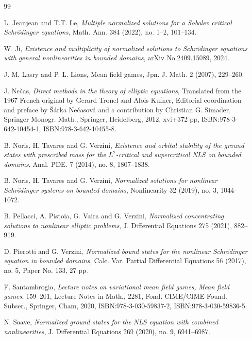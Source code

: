 \documentclass[11pt]{amsart}
\numberwithin{equation}{section}
\begin{document}
\begin{thebibliography}{99}

 L. Jeanjean and T.T. Le, {\it Multiple normalized solutions for a Sobolev critical Schr\"odinger  equations}, Math. Ann.
384 (2022), no. 1--2, 101--134.

 W. Ji, {\it Existence and multiplicity of normalized solutions to Schr\"odinger equations with general nonlinearities in bounded domains}, arXiv No.2409.15089, 2024.


J. M. Lasry and P. L. Lions, Mean field games, Jpn. J. Math. 2 (2007), 229--260.

J. Ne\v{c}as, {\it Direct methods in the theory of elliptic equations}, Translated from the 1967 French original by Gerard Tronel and Alois Kufner, Editorial coordination and preface by \v{S}\'arka Ne\v{c}asov\'a and a contribution by Christian G. Simader, Springer Monogr. Math., Springer, Heidelberg, 2012, xvi+372 pp, ISBN:978-3-642-10454-1, ISBN:978-3-642-10455-8.

 B. Noris, H. Tavares and G. Verzini, {\it Existence and orbital stability of the ground
	states with prescribed mass for the $L^2$-critical and supercritical NLS on bounded domains},
Anal. PDE. 7 (2014), no. 8, 1807--1838.

 B. Noris, H. Tavares and G. Verzini, {\it Normalized solutions for nonlinear Schr\"odinger systems on bounded domains},
Nonlinearity 32 (2019), no. 3, 1044--1072.

B. Pellacci, A. Pistoia, G. Vaira and G. Verzini, {\it Normalized concentrating solutions to nonlinear elliptic problems}, J. Differential Equations 275 (2021), 882--919.

 D. Pierotti and G. Verzini, {\it Normalized bound states for the nonlinear  Schr\"odinger equation in bounded domains},
Calc. Var. Partial Differential Equations  56 (2017), no. 5, Paper No. 133, 27 pp.

F. Santambrogio, {\it Lecture notes on variational mean field games, Mean field games}, 159--201, Lecture Notes in Math., 2281, Fond. CIME/CIME Found. Subser., Springer, Cham, 2020, ISBN:978-3-030-59837-2, ISBN:978-3-030-59836-5.


  N. Soave, {\it Normalized ground states for the NLS equation with combined nonlinearities}, J. Differential Equations
269 (2020), no. 9, 6941--6987.




\end{thebibliography}
\end{document}
